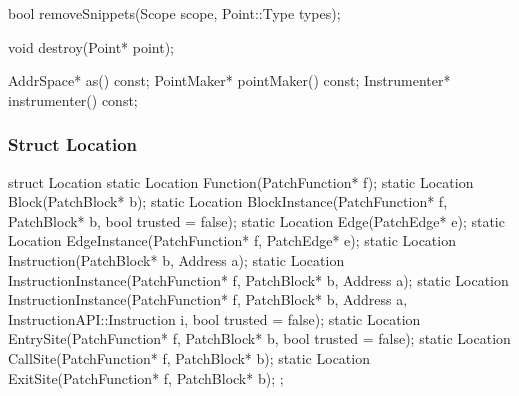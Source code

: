 
\begin{apient}
bool removeSnippets(Scope scope, Point::Type types);
\end{apient}


\begin{apient}
void destroy(Point* point);
\end{apient}


\begin{apient}
AddrSpace* as() const;
PointMaker* pointMaker() const;
Instrumenter* instrumenter() const;
\end{apient}


\subsubsection{Struct Location}


\begin{apient}
struct Location {
   static Location Function(PatchFunction* f);
   static Location Block(PatchBlock* b);
   static Location BlockInstance(PatchFunction* f, PatchBlock* b, bool trusted = false);
   static Location Edge(PatchEdge* e);
   static Location EdgeInstance(PatchFunction* f, PatchEdge* e);
   static Location Instruction(PatchBlock* b, Address a);
   static Location InstructionInstance(PatchFunction* f, PatchBlock* b, Address a);
   static Location InstructionInstance(PatchFunction* f, PatchBlock* b, Address a,
                                       InstructionAPI::Instruction i,
                                       bool trusted = false);
   static Location EntrySite(PatchFunction* f, PatchBlock* b, bool trusted = false);
   static Location CallSite(PatchFunction* f, PatchBlock* b);
   static Location ExitSite(PatchFunction* f, PatchBlock* b);
};
\end{apient}

